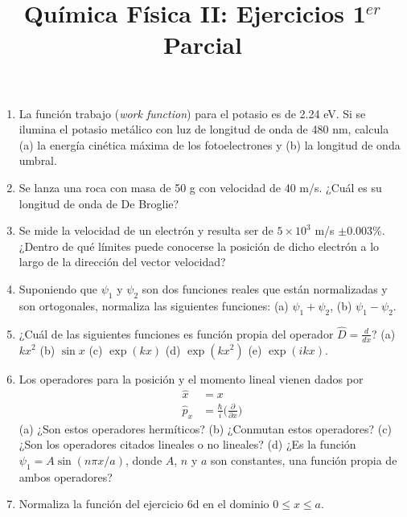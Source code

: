 \documentclass{tufte-handout}
\title[Química Física II: Ejercicios 1$^{er}$ Set]{
Química Física II: Ejercicios 1$^{er}$ Parcial}
\date{}  %
\begin{document}
\maketitle
\large
\begin{enumerate}
    \item La función trabajo (\textit{work
    function}) para el potasio es de 2.24
    eV. Si se ilumina el potasio metálico
    con luz de longitud de onda de 480 nm,
    calcula (a) la energía cinética máxima
    de los fotoelectrones y (b) la longitud
    de onda umbral.
    
    \item Se lanza una roca con masa de 
    50 g con velocidad de 40 m/s. ¿Cuál es
    su longitud de onda de De Broglie?
    
    \item Se mide la velocidad de un
    electrón y resulta ser de $5\times10^3$
    m/s $\pm$0.003\%. ¿Dentro de qué
    límites puede conocerse la posición de
    dicho electrón a lo largo de la
    dirección del vector velocidad?
    
    \item Suponiendo que $\psi_1$ y
    $\psi_2$ son dos funciones reales que 
    están normalizadas y son ortogonales, 
    normaliza las siguientes funciones:
    (a) $\psi_1+\psi_2$, (b) 
    $\psi_1-\psi_2$.
    
    \item ¿Cuál de las siguientes funciones
    es función propia del operador
    $\hat{D}=\frac{d}{dx}$? (a) $kx^2$
    (b) $\sin x$ (c) $\exp (kx)$ 
    (d) $\exp(kx^2)$ (e) $\exp(ikx)$.
    
    \item Los operadores para la posición y
    el momento lineal vienen dados por 
    \begin{equation}
        \begin{array}{cc}
             \hat{x}& =x  \\
            \hat{p}_x& =\frac{\hbar}{i}\big(\frac{\partial}{\partial x}\big)
        \end{array}
    \end{equation}
    (a) ¿Son estos operadores hermíticos?
    (b) ¿Conmutan estos operadores?
    (c) ¿Son los operadores citados lineales
    o no lineales?
    (d) ¿Es la función $\psi_1=A\sin (n\pi
    x/a)$, donde $A$, $n$ y $a$ son
    constantes, una función propia de ambos
    operadores?
   
   \item Normaliza la función del ejercicio
   6d en el dominio $0\leq x\leq a$.
   

\end{enumerate}
\end{document}
